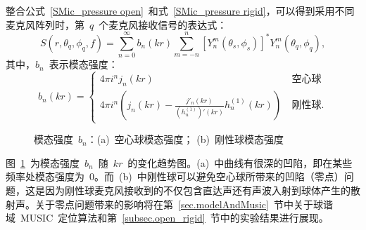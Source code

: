 整合公式~\eqref{SMic_pressure open}~和式~\eqref{SMic_pressure rigid}，可以得到采用不同麦克风阵列时，第~$q$~个麦克风接收信号的表达式：
\begin{equation}  \label{SMic_pressure}
   S(r,\theta_q,\phi_q,f)=
   \sum _{n=0}^{\infty} b_n(kr) \sum _{m=-n}^{n}[Y_n ^{m}(\theta_s,\phi_s)]^*Y_n ^{m}(\theta_q,\phi_q),
\end{equation}
其中，$b_n$~表示模态强度：
\begin{equation}\label{eq.bn(kr)}
b_n(kr) =
\begin{cases}
 4\pi i^n j_n(kr)  & ~\mbox{空心球} \\
 4\pi i^n \left(j_n(kr)-\frac{j'_n (kr)}{({h^{(1)}_n})'(kr)}h_n^{(1)}(kr) \right) & ~\mbox{刚性球}.
\end{cases}
\end{equation}


\begin{figure}[H]
\centering
{}
\hfill
{}
\caption{模态强度~$b_n$：(a)~空心球模态强度； (b)~刚性球模态强度}
\label{fig:bn}
\end{figure}

图~\ref{fig:bn}~为模态强度~$b_n$~随~$kr$~的变化趋势图。(a)~中曲线有很深的凹陷，即在某些频率处模态强度为~0。而~(b)~中刚性球可以避免空心球所带来的凹陷（零点）问题，这是因为刚性球麦克风接收到的不仅包含直达声还有声波入射到球体产生的散射声。关于零点问题带来的影响将在第~\ref{sec.modelAndMusic}~节中关于球谐域~MUSIC~定位算法和第~\ref{subsec.open_rigid}~节中的实验结果进行展现。

